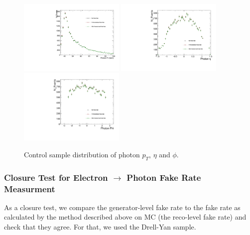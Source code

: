 \begin{figure}[H]
\begin{center}
  {\includegraphics[width=0.45\textwidth]{efake_figs/CS_param_pt.pdf}}
  {\includegraphics[width=0.45\textwidth]{efake_figs/CS_param_eta.pdf}}
\\
  {\includegraphics[width=0.45\textwidth]{efake_figs/CS_param_phi.pdf}}
\caption{Control sample distribution of photon $p_T$, $\eta$ and $\phi$.}
\label{CS_params}
\end{center}
\end{figure}

\subsubsection{Closure Test for Electron $\rightarrow$ Photon Fake Rate Measurment}

As a closure test, we compare the generator-level fake rate to the fake rate as calculated by the method described above on MC (the reco-level fake rate) and check that they agree.
For that, we used the Drell-Yan sample.


